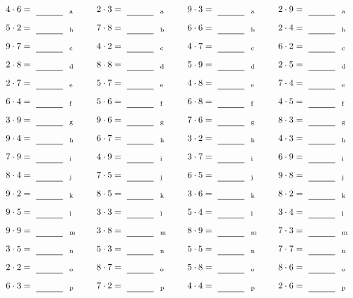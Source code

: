 \documentclass
[
  draft    = true,
  fontsize = 11pt,
  parskip  = half-
]
{scrartcl}
\begin{document}
\par\vfill\par
\begin{align*}
    \pline{4\cdot6}&=\rline{a}
  & \pline{2\cdot3}&=\rline{a}
  & \pline{9\cdot3}&=\rline{a}
  & \pline{2\cdot9}&=\rline{a} \\[1ex]
    \pline{5\cdot2}&=\rline{b}
  & \pline{7\cdot8}&=\rline{b}
  & \pline{6\cdot6}&=\rline{b}
  & \pline{2\cdot4}&=\rline{b} \\[1ex]
    \pline{9\cdot7}&=\rline{c}
  & \pline{4\cdot2}&=\rline{c}
  & \pline{4\cdot7}&=\rline{c}
  & \pline{6\cdot2}&=\rline{c} \\[1ex]
    \pline{2\cdot8}&=\rline{d}
  & \pline{8\cdot8}&=\rline{d}
  & \pline{5\cdot9}&=\rline{d}
  & \pline{2\cdot5}&=\rline{d} \\[1ex]
    \pline{2\cdot7}&=\rline{e}
  & \pline{5\cdot7}&=\rline{e}
  & \pline{4\cdot8}&=\rline{e}
  & \pline{7\cdot4}&=\rline{e} \\[1ex]
    \pline{6\cdot4}&=\rline{f}
  & \pline{5\cdot6}&=\rline{f}
  & \pline{6\cdot8}&=\rline{f}
  & \pline{4\cdot5}&=\rline{f} \\[1ex]
    \pline{3\cdot9}&=\rline{g}
  & \pline{9\cdot6}&=\rline{g}
  & \pline{7\cdot6}&=\rline{g}
  & \pline{8\cdot3}&=\rline{g} \\[1ex]
    \pline{9\cdot4}&=\rline{h}
  & \pline{6\cdot7}&=\rline{h}
  & \pline{3\cdot2}&=\rline{h}
  & \pline{4\cdot3}&=\rline{h} \\[1ex]
    \pline{7\cdot9}&=\rline{i}
  & \pline{4\cdot9}&=\rline{i}
  & \pline{3\cdot7}&=\rline{i}
  & \pline{6\cdot9}&=\rline{i} \\[1ex]
    \pline{8\cdot4}&=\rline{j}
  & \pline{7\cdot5}&=\rline{j}
  & \pline{6\cdot5}&=\rline{j}
  & \pline{9\cdot8}&=\rline{j} \\[1ex]
    \pline{9\cdot2}&=\rline{k}
  & \pline{8\cdot5}&=\rline{k}
  & \pline{3\cdot6}&=\rline{k}
  & \pline{8\cdot2}&=\rline{k} \\[1ex]
    \pline{9\cdot5}&=\rline{l}
  & \pline{3\cdot3}&=\rline{l}
  & \pline{5\cdot4}&=\rline{l}
  & \pline{3\cdot4}&=\rline{l} \\[1ex]
    \pline{9\cdot9}&=\rline{m}
  & \pline{3\cdot8}&=\rline{m}
  & \pline{8\cdot9}&=\rline{m}
  & \pline{7\cdot3}&=\rline{m} \\[1ex]
    \pline{3\cdot5}&=\rline{n}
  & \pline{5\cdot3}&=\rline{n}
  & \pline{5\cdot5}&=\rline{n}
  & \pline{7\cdot7}&=\rline{n} \\[1ex]
    \pline{2\cdot2}&=\rline{o}
  & \pline{8\cdot7}&=\rline{o}
  & \pline{5\cdot8}&=\rline{o}
  & \pline{8\cdot6}&=\rline{o} \\[1ex]
    \pline{6\cdot3}&=\rline{p}
  & \pline{7\cdot2}&=\rline{p}
  & \pline{4\cdot4}&=\rline{p}
  & \pline{2\cdot6}&=\rline{p}
\end{align*}
\end{document}
